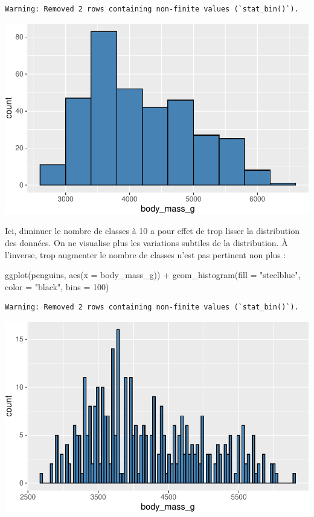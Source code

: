 \documentclass[
  a4paper,
  DIV=11,
  numbers=noendperiod,
  oneside]{scrreprt}
\newenvironment{Shaded}{}{}
\newcommand{\AttributeTok}[1]{\textcolor[rgb]{0.84,0.23,0.29}{#1}}
\newcommand{\DecValTok}[1]{\textcolor[rgb]{0.00,0.36,0.77}{#1}}
\newcommand{\FunctionTok}[1]{\textcolor[rgb]{0.44,0.26,0.76}{#1}}
\newcommand{\NormalTok}[1]{\textcolor[rgb]{0.14,0.16,0.18}{#1}}
\newcommand{\SpecialCharTok}[1]{\textcolor[rgb]{0.00,0.36,0.77}{#1}}
\newcommand{\StringTok}[1]{\textcolor[rgb]{0.01,0.18,0.38}{#1}}
\begin{document}
\begin{verbatim}
Warning: Removed 2 rows containing non-finite values (`stat_bin()`).
\end{verbatim}

\includegraphics{03-visualization_files/figure-pdf/unnamed-chunk-13-1.pdf}

Ici, diminuer le nombre de classes à 10 a pour effet de trop lisser la
distribution des données. On ne visualise plus les variations subtiles
de la distribution. À l'inverse, trop augmenter le nombre de classes
n'est pas pertinent non plus :

\begin{Shaded}
\begin{Highlighting}[]
\FunctionTok{ggplot}\NormalTok{(penguins, }\FunctionTok{aes}\NormalTok{(}\AttributeTok{x =}\NormalTok{ body\_mass\_g)) }\SpecialCharTok{+}
  \FunctionTok{geom\_histogram}\NormalTok{(}\AttributeTok{fill =} \StringTok{"steelblue"}\NormalTok{, }\AttributeTok{color =} \StringTok{"black"}\NormalTok{,}
                 \AttributeTok{bins =} \DecValTok{100}\NormalTok{)}
\end{Highlighting}
\end{Shaded}

\begin{verbatim}
Warning: Removed 2 rows containing non-finite values (`stat_bin()`).
\end{verbatim}

\includegraphics{03-visualization_files/figure-pdf/unnamed-chunk-14-1.pdf}
\end{document}
